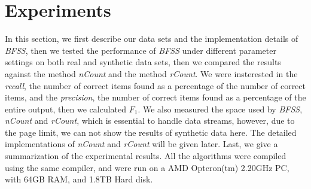 \documentclass[conference]{IEEEtran}
\begin{document}
\section{Experiments}
In this section, we first describe our data sets and the implementation details of \emph{BFSS}, then we tested the performance of \emph{BFSS} under different parameter settings on both real and synthetic data sets, then we compared the results against the method \emph{nCount} and the method \emph{rCount}. We were insterested in the \emph{recall}, the number of correct items found as a percentage of the number of correct items, and the \emph{precision}, the number of correct items found as a percentage of the entire output, then we calculated $F_1$. We also measured the space used by \emph{BFSS}, \emph{nCount} and \emph{rCount}, which is essential to handle data streams, however, due to the page limit, we can not show the results of synthetic data here. The detailed implementations of \emph{nCount} and \emph{rCount} will be given later. Last, we give a summarization of the experimental results. All the algorithms were compiled using the same compiler, and were run on a AMD Opteron(tm) 2.20GHz PC, with 64GB RAM, and 1.8TB Hard disk.\par
\end{document}
